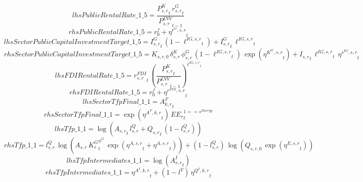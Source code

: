 \begin{dmath*}
lhsPublicRentalRate\_1\_5 = \frac{{{P^K_{s,r}}}_{t}\, {{r^G_{s,r}}}_{t}}{{{P^{INV}_{s,r}}}_{t-1}}
\end{dmath*}
\begin{dmath*}
rhsPublicRentalRate\_1\_5 = {{r^f_0}}+{{\eta^{r^G,s,r}}}_{t}
\end{dmath*}
\begin{dmath*}
lhsSectorPublicCapitalInvestmentTarget\_1\_5 = {{I^G_{s,r}}}_{t}\, \left(1-{{\ell^{IG,s,r}}}_{t}\right)+{{I^G_{s,r}}}_{t}\, {{\ell^{IG,s,r}}}_{t}
\end{dmath*}
\begin{dmath*}
rhsSectorPublicCapitalInvestmentTarget\_1\_5 = {{K_{s,r,0}}}\, {{\delta^{K}_{s,r}}}\, {{\phi^{G}_{s,r}}}\, \left(1-{{\ell^{IG,s,r}}}_{t}\right)\, \exp\left({{\eta^{K^G,s,r}}}_{t}\right)+{{I_{s,r}}}_{t}\, {{\ell^{IG,s,r}}}_{t}\, {{\eta^{s^{IG},s,r}}}_{t}
\end{dmath*}
\begin{dmath*}
lhsFDIRentalRate\_1\_5 = {{r^{FDI}_{s,r}}}_{t}\, \left(\frac{{{P^K_{s,r}}}_{t}}{{{P^{INV}_{s,r}}}_{t-1}}\right)^{{{\ell^{IG,s,r}}}_{t}}
\end{dmath*}
\begin{dmath*}
rhsFDIRentalRate\_1\_5 = {{r^f_0}}+{{\eta^{r^{FDI},s,r}}}_{t}
\end{dmath*}
\begin{dmath*}
lhsSectorTfpFinal\_1\_1 = {{A^{F}_{k,r}}}_{t}
\end{dmath*}
\begin{dmath*}
rhsSectorTfpFinal\_1\_1 = \exp\left({{\eta^{A^F,k,r}}}_{t}\right)\, {{EE_r}}_{t}^{1=={{s^{Energy}}}}
\end{dmath*}
\begin{dmath*}
lhsTfp\_1\_1 = \log\left({{A_{s,r}}}_{t}\, {{l^{Q}_{s,r}}}+{{Q_{s,r}}}_{t}\, \left(1-{{l^{Q}_{s,r}}}\right)\right)
\end{dmath*}
\begin{dmath*}
rhsTfp\_1\_1 = {{l^{Q}_{s,r}}}\, \log\left({{A_{s,r}}}\, {{K^G_{r}}}_{t}^{{{\phi^{G}}}}\, \exp\left({{\eta^{A,s,r}}}_{t}+{{\eta^{A,s,r}}}_{t}\right)\right)+\left(1-{{l^{Q}_{s,r}}}\right)\, \log\left({{Q_{s,r,0}}}\, \exp\left({{\eta^{E,s,r}}}_{t}\right)\right)
\end{dmath*}
\begin{dmath*}
lhsTfpIntermediates\_1\_1 = \log\left({{A^{I}_{s,r}}}_{t}\right)
\end{dmath*}
\begin{dmath*}
rhsTfpIntermediates\_1\_1 = {{\eta^{A^{I},k,r}}}_{t}+\left(1-{{l^{Y}}}\right)\, {{\eta^{Q^{I},k,r}}}_{t}
\end{dmath*}
